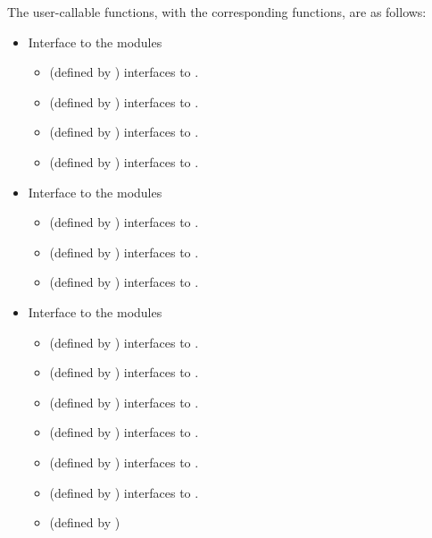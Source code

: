 The user-callable functions, with the corresponding {\ida} functions,
are as follows:
\begin{itemize}
\item
  Interface to the {\nvector} modules
  \begin{itemize}
  \item {} (defined by {\nvecs}) 
    interfaces to .
  \item {} (defined by {\nvecp}) 
    interfaces to .
  \item {} (defined by {\nvecopenmp}) 
    interfaces to .
  \item {} (defined by {\nvecpthreads}) 
    interfaces to .
  \end{itemize}
\item
  Interface to the {\sunmatrix} modules
  \begin{itemize}
  \item {} (defined by {\sunmatband}) 
    interfaces to .
  \item {} (defined by {\sunmatdense}) 
    interfaces to .
  \item {} (defined by {\sunmatsparse}) 
    interfaces to .
  \end{itemize}
\item
  Interface to the {\sunlinsol} modules
  \begin{itemize}
  \item {} (defined by {\sunlinsolband}) 
    interfaces to .
  \item {} (defined by {\sunlinsoldense}) 
    interfaces to .
  \item {} (defined by {\sunlinsolklu}) 
    interfaces to .
  \item {} (defined by {\sunlinsolklu}) 
    interfaces to .
  \item {} (defined by {\sunlinsollapband}) 
    interfaces to .
  \item {} (defined by {\sunlinsollapdense}) 
    interfaces to .
  \item {} (defined by {\sunlinsolpcg}) 

\end{itemize}
\end{itemize}
